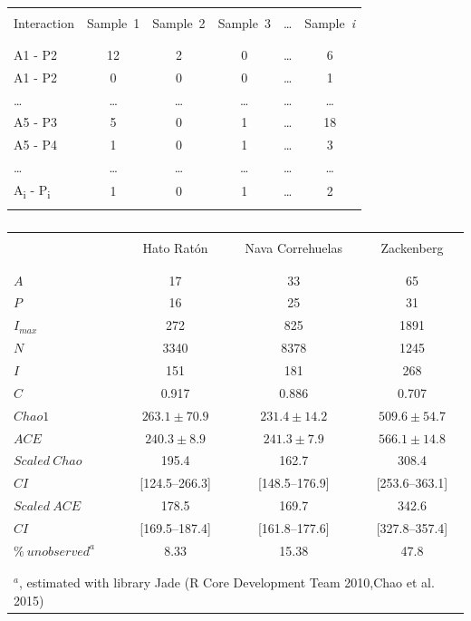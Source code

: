 \documentclass[12pt]{article}
\begin{document}
\begin{table}[h!]
  \caption{}
  \label{TabENFA}
  \begin{center}
    \begin{tabular}{lccccc}
      \hline
\\Interaction&Sample\ 1&Sample\ 2&Sample\ 3&{\ldots}&Sample\ \emph{i}\\\\
      \hline
\\A1 - P2&12&2&0&{\ldots}&6\\
A1 - P2&0&0&0&{\ldots}&1\\
{\ldots}&{\ldots}&{\ldots}&{\ldots}&{\ldots}&{\ldots}\\
A5 - P3&5&0&1&{\ldots}&18\\
A5 - P4&1&0&1&{\ldots}&3\\
{\ldots}&{\ldots}&{\ldots}&{\ldots}&{\ldots}&{\ldots}\\
A\textsubscript{i} - P\textsubscript{i}&1&0&1&{\ldots}&2\\\\
      \hline
    \end{tabular}
  \end{center}
\end{table}
%
\newpage
\begin{table}[h!]
  \caption{}
  \label{TabENFA}
  \begin{center}
    \begin{tabular}{lccc}
      \hline
\\       &Hato Rat\'on  &  Nava Correhuelas&    Zackenberg\\\\
      \hline             
\\$A$&17&33&65\\
$P$&16&25&31\\
$I_{max}$&272&825&1891\\
$N$&3340&8378&1245\\
$I$&151&181&268\\
$C$&0.917&0.886&0.707\\
$Chao1$&$263.1\pm70.9$&$231.4\pm14.2$&$509.6\pm54.7$\\
$ACE$&$240.3\pm8.9$&$241.3\pm7.9$&$566.1\pm14.8$\\
$Scaled\ Chao$&195.4&162.7&308.4\\
$CI$&[124.5--266.3]&[148.5--176.9]&[253.6--363.1]\\
$Scaled\ ACE$&178.5&169.7&342.6\\
$CI$&[169.5--187.4]&[161.8--177.6]&[327.8--357.4]\\
$\%\ unobserved^a$&8.33&15.38&47.8\\\\
      \hline
\\\multicolumn{4}{l}{$^a$, estimated with library Jade (R Core Development Team 2010,Chao et al. 2015)}\\
    \end{tabular}
  \end{center}
\end{table}
\end{document}
